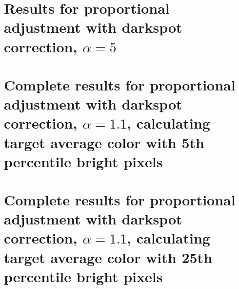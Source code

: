 \documentclass[12pt, a4paper]{article}
\begin{document}
\section{Results for proportional adjustment with darkspot correction, $\alpha = 5$}\label{app:prop_corr_ave_a5}


\section{Complete results for proportional adjustment with darkspot correction, $\alpha = 1.1$, calculating target average color with 5th percentile bright pixels}\label{app:prop_corr_ave_a1p1_perc5}


\section{Complete results for proportional adjustment with darkspot correction, $\alpha = 1.1$, calculating target average color with 25th percentile bright pixels}\label{app:prop_corr_ave_a1p1_perc25}

\end{document}
